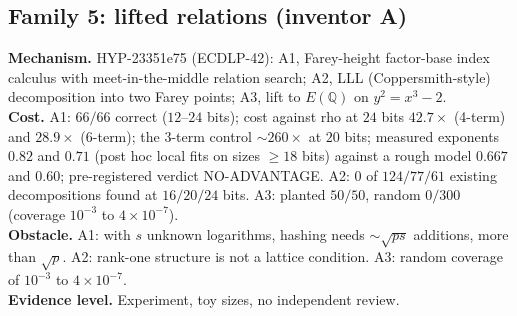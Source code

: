 \documentclass[11pt,a4paper]{article}
\theoremstyle{remark}
\begin{document}
\subsection{Family 5: lifted relations (inventor A)}
\textbf{Mechanism.} \mbox{HYP-23351e75} (ECDLP-42): A1, Farey-height factor-base index calculus with meet-in-the-middle relation search; A2, LLL (Coppersmith-style) decomposition into two Farey points; A3, lift to $E(\mathbb Q)$ on $y^2=x^3-2$.\\
\textbf{Cost.} A1: $66/66$ correct ($12$--$24$ bits); cost against rho at $24$ bits $42.7\times$ (4-term) and $28.9\times$ (6-term); the $3$-term control $\sim260\times$ at $20$ bits; measured exponents $0.82$ and $0.71$ (post hoc local fits on sizes $\ge18$ bits) against a rough model $0.667$ and $0.60$; pre-registered verdict NO-ADVANTAGE. A2: $0$ of $124/77/61$ existing decompositions found at $16/20/24$ bits. A3: planted $50/50$, random $0/300$ (coverage $10^{-3}$ to $4\times10^{-7}$).\\
\textbf{Obstacle.} A1: with $s$ unknown logarithms, hashing needs $\sim\sqrt{ps}$ additions, more than $\sqrt p$. A2: rank-one structure is not a lattice condition. A3: random coverage of $10^{-3}$ to $4\times10^{-7}$.\\
\textbf{Evidence level.} Experiment, toy sizes, no independent review.
\end{document}
